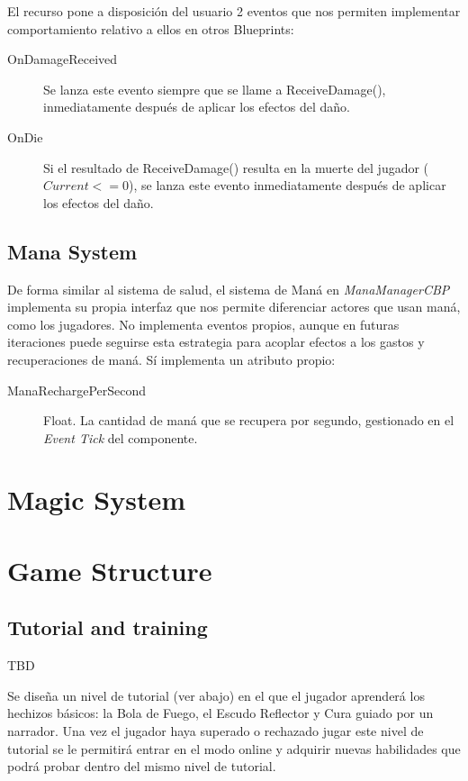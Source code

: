 \documentclass[12pt]{report}
\begin{document}
El recurso pone a disposición del usuario 2 eventos que nos permiten implementar comportamiento relativo a ellos en otros Blueprints:

\begin{description}
	\item[OnDamageReceived] Se lanza este evento siempre que se llame a ReceiveDamage(), inmediatamente después de aplicar los efectos del daño.
	\item[OnDie] Si el resultado de ReceiveDamage() resulta en la muerte del jugador ($Current <= 0$), se lanza este evento inmediatamente después de aplicar los efectos del daño.
\end{description}

\subsection{Mana System}

De forma similar al sistema de salud, el sistema de Maná en \textit{\emph{ManaManagerCBP}} implementa su propia interfaz que nos permite diferenciar actores que usan maná, como los jugadores. No implementa eventos propios, aunque en futuras iteraciones puede seguirse esta estrategia para acoplar efectos a los gastos y recuperaciones de maná. Sí implementa un atributo propio:

\begin{description}
	\item[ManaRechargePerSecond] Float. La cantidad de maná que se recupera por segundo, gestionado en el \textit{Event Tick} del componente.
\end{description}

\section{Magic System} 

\section{Game Structure}              

\subsection{Tutorial and training}

TBD

Se diseña un nivel de tutorial (ver abajo) en el que el jugador aprenderá los hechizos básicos: la Bola de Fuego, el Escudo Reflector y Cura guiado por un narrador. Una vez el jugador haya superado o rechazado jugar este nivel de tutorial se le permitirá entrar en el modo online y adquirir nuevas habilidades que podrá probar dentro del mismo nivel de tutorial.
\end{document}
